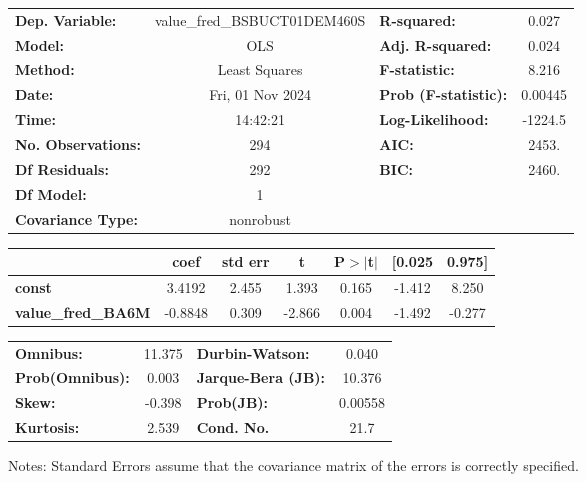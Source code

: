 \begin{center}
\begin{tabular}{lclc}
\toprule
\textbf{Dep. Variable:}    & value\_fred\_BSBUCT01DEM460S & \textbf{  R-squared:         } &     0.027   \\
\textbf{Model:}            &             OLS              & \textbf{  Adj. R-squared:    } &     0.024   \\
\textbf{Method:}           &        Least Squares         & \textbf{  F-statistic:       } &     8.216   \\
\textbf{Date:}             &       Fri, 01 Nov 2024       & \textbf{  Prob (F-statistic):} &  0.00445    \\
\textbf{Time:}             &           14:42:21           & \textbf{  Log-Likelihood:    } &   -1224.5   \\
\textbf{No. Observations:} &               294            & \textbf{  AIC:               } &     2453.   \\
\textbf{Df Residuals:}     &               292            & \textbf{  BIC:               } &     2460.   \\
\textbf{Df Model:}         &                 1            & \textbf{                     } &             \\
\textbf{Covariance Type:}  &          nonrobust           & \textbf{                     } &             \\
\bottomrule
\end{tabular}
\begin{tabular}{lcccccc}
                           & \textbf{coef} & \textbf{std err} & \textbf{t} & \textbf{P$> |$t$|$} & \textbf{[0.025} & \textbf{0.975]}  \\
\midrule
\textbf{const}             &       3.4192  &        2.455     &     1.393  &         0.165        &       -1.412    &        8.250     \\
\textbf{value\_fred\_BA6M} &      -0.8848  &        0.309     &    -2.866  &         0.004        &       -1.492    &       -0.277     \\
\bottomrule
\end{tabular}
\begin{tabular}{lclc}
\textbf{Omnibus:}       & 11.375 & \textbf{  Durbin-Watson:     } &    0.040  \\
\textbf{Prob(Omnibus):} &  0.003 & \textbf{  Jarque-Bera (JB):  } &   10.376  \\
\textbf{Skew:}          & -0.398 & \textbf{  Prob(JB):          } &  0.00558  \\
\textbf{Kurtosis:}      &  2.539 & \textbf{  Cond. No.          } &     21.7  \\
\bottomrule
\end{tabular}
\end{center}

Notes: \newline
 [1] Standard Errors assume that the covariance matrix of the errors is correctly specified.